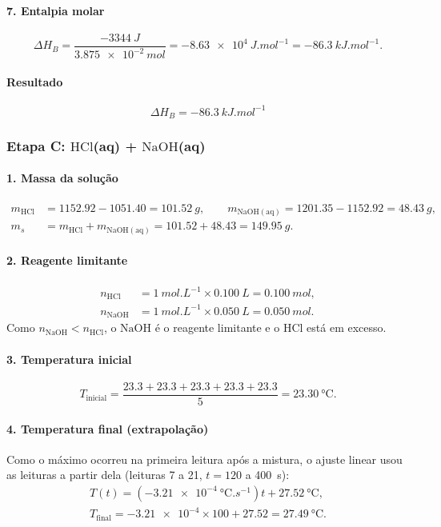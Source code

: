 \paragraph{7. Entalpia molar}
\[
\Delta H_B=\frac{\SI{-3344}{J}}{\SI{3,875e-2}{mol}}
=\SI{-8,63e4}{J.mol^{-1}}
=\SI{-86,3}{kJ.mol^{-1}}.
\]

\paragraph{Resultado}
\[
\boxed{\Delta H_B=\SI{-86,3}{kJ.mol^{-1}}}
\]

\subsubsection{Etapa C: $\mathrm{HCl}$(aq) + $\mathrm{NaOH}$(aq)}

\paragraph{1. Massa da solução}
\[
\begin{aligned}
m_{\mathrm{HCl}} &= \num{1152,92} - \num{1051,40} = \SI{101,52}{g}, \qquad m_{\mathrm{NaOH(aq)}} = \num{1201,35} - \num{1152,92} = \SI{48,43}{g},\\
m_s &= m_{\mathrm{HCl}} + m_{\mathrm{NaOH(aq)}} = \num{101,52} + \num{48,43} = \SI{149,95}{g}.
\end{aligned}
\]

\paragraph{2. Reagente limitante}
\[
\begin{aligned}
n_{\mathrm{HCl}} &= \SI{1}{mol.L^{-1}}\times\SI{0,100}{L} = \SI{0,100}{mol},\\
n_{\mathrm{NaOH}} &= \SI{1}{mol.L^{-1}}\times\SI{0,050}{L} = \SI{0,050}{mol}.
\end{aligned}
\]
Como $n_{\mathrm{NaOH}} < n_{\mathrm{HCl}}$, o $\mathrm{NaOH}$ é o reagente limitante e o $\mathrm{HCl}$ está em excesso.

\paragraph{3. Temperatura inicial}
\[
T_{\text{inicial}}=\frac{\num{23,3}+\num{23,3}+\num{23,3}+\num{23,3}+\num{23,3}}{5}
=\SI{23,30}{\degreeCelsius}.
\]

\paragraph{4. Temperatura final (extrapolação)}
Como o máximo ocorreu na primeira leitura após a mistura, o ajuste linear usou as leituras a partir dela (leituras 7 a 21, $t = 120$ a \SI{400}{s}):
\[
\begin{gathered}
T(t)=\left(\num{-3,21e-4}\ \si{\degreeCelsius.s^{-1}}\right)t+\SI{27,52}{\degreeCelsius},\\
T_{\text{final}}=\num{-3,21e-4}\times100+\num{27,52}=\SI{27,49}{\degreeCelsius}.
\end{gathered}
\]

